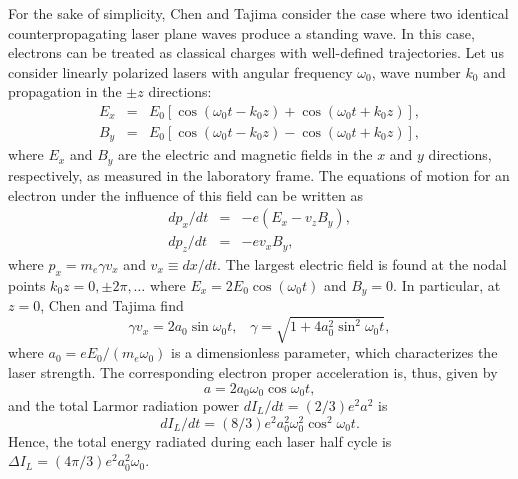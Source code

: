 \documentclass[12pt,nofootinbib,floatfix,aps,prd,showpacs,amsmath,amssymb,eqsecnum]{revtex4-2}
\begin{document}
For the sake of simplicity, Chen and Tajima consider the case where two
identical counterpropagating laser plane waves  produce a standing wave.
In this case, electrons can be treated as 
classical charges with well-defined trajectories. Let us consider linearly 
polarized lasers with angular frequency $\omega_0 $, wave number $k_0$ and 
propagation in the $\pm z$ directions:
\begin{eqnarray}
E_x &=& E_0[\cos (\omega_0 t - k_0 z) + \cos (\omega_0 t + k_0 z)],
\nonumber \\
B_y &=& E_0[\cos (\omega_0 t - k_0 z) - \cos (\omega_0 t + k_0 z)],
\nonumber
\end{eqnarray}
where $E_x$ and $B_y$ are the electric and magnetic fields in the $x$ 
and $y$ directions, respectively, as measured in the laboratory frame.
The equations of motion for an electron under the influence of this 
field can be written as
\begin{eqnarray}
dp_x/dt & = & -e (E_x - v_z B_y),
\nonumber \\
dp_z/dt & = & -e v_x B_y,
\nonumber
\end{eqnarray}
where 
$p_{x} = m_e \gamma v_{x}$
and 
$v_{x} \equiv dx / dt$.
The largest electric field is found at the nodal points
$k_0 z = 0, \pm 2\pi, \ldots $ where $E_x = 2 E_0 \cos (\omega_0 t)$ 
and $B_y = 0$. In particular, at $z=0$, Chen and Tajima find
$$
\gamma v_x = 2 a_0 \sin \omega_0 t, \;\;\; 
\gamma = \sqrt{1+4 a_0^2 \sin^2 \omega_0 t},
$$
where
$a_0 = e E_0/(m_e \omega_0)$ 
is a dimensionless parameter, which characterizes the laser strength. 
The corresponding electron proper acceleration is, thus, given by
$$
a = 2 a_0 \omega_0 \cos \omega_0 t,
$$
and the total Larmor radiation power ${dI_L}/{dt} = (2/3) e^2 a^2 $ is
\begin{equation}
{dI_L}/{dt} =  (8/3) e^2 a_0^2 \omega_0^2 \cos^2 \omega_0 t. 
\end{equation}
Hence, the total energy radiated during each laser half cycle is
$\Delta I_L = (4 \pi/3) e^2 a_0^2 \omega_0$. 
\end{document}
